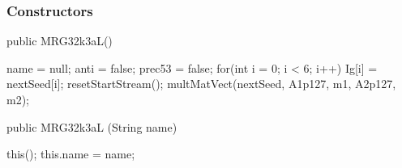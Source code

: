 \subsubsection* {Constructors}

\begin{code}

   public MRG32k3aL() \begin{hide} {
      name = null;
      anti = false;
      prec53 = false;
      for(int i = 0; i < 6; i++)
         Ig[i] = nextSeed[i];
      resetStartStream();
      multMatVect(nextSeed, A1p127, m1, A2p127, m2);
   } \end{hide}
\end{code}
\iffalse
 \begin{tabb} Constructs a new stream, initializes its seed $I_g$,
   sets $B_g$ and $C_g$ equal to $I_g$, and sets its antithetic switch
   to \texttt{false}.
   The seed $I_g$ is equal to the initial seed of the package given by
   \method{setPackageSeed}{long[]} if this is the first stream created,
   otherwise it is $Z$ steps ahead of that of the stream most recently
   created in this class.
 \end{tabb}
\fi
\begin{code}

   public MRG32k3aL (String name) \begin{hide} {
      this();
      this.name = name;
   } \end{hide}
\end{code}
\iffalse
 \begin{tabb}  Constructs a new stream with an identifier \texttt{name}
   (used when printing the stream state).
 \end{tabb}
\fi
\begin{htmlonly}
\end{htmlonly}

